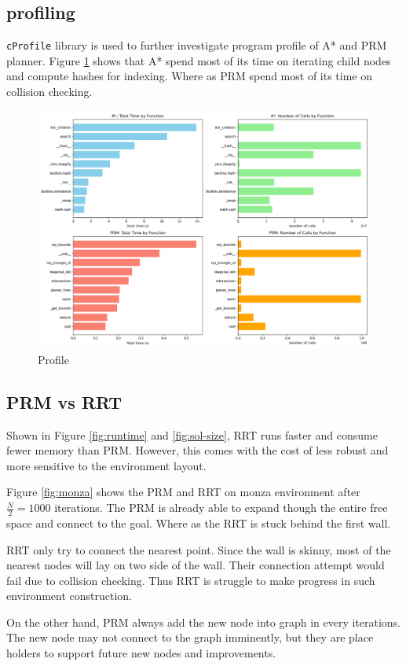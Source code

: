 \documentclass[conference]{IEEEtran}
\begin{document}
\subsection{profiling}
\texttt{cProfile} library is used to further investigate program profile of A* and PRM planner.
Figure \ref{fig:profile} shows that 
A* spend most of its time on iterating child nodes and compute hashes for indexing.
Where as PRM spend most of its time on collision checking.

\begin{figure}
    \centering
    \includegraphics[width=0.8\linewidth]{img/profile.png}
    \caption{Profile}
    \label{fig:profile}
\end{figure}

\subsection{PRM vs RRT}
Shown in  Figure \ref{fig:runtime} and \ref{fig:sol-size},
RRT runs faster and consume fewer memory than PRM.
However, this comes with the cost of less robust and more sensitive 
to the environment layout.

Figure \ref{fig:monza} shows the PRM and RRT on monza environment 
after $\frac{N}{2} = 1000$ iterations.
The PRM is already able to expand though the entire free space and connect to the goal.
Where as the RRT is stuck behind the first wall.

RRT only try to connect the nearest point.
Since the wall is skinny, 
most of the nearest nodes will lay on two side of the wall.
Their connection attempt would fail due to collision checking.
Thus RRT is struggle to make progress in such environment construction.

On the other hand, PRM always add the new node into graph in every iterations.
The new node may not connect to the graph imminently, 
but they are place holders to support future new nodes and improvements.
\end{document}
